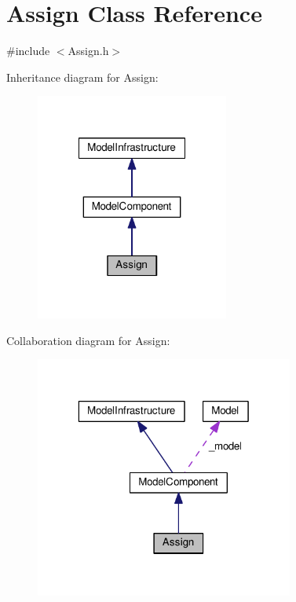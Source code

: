 \hypertarget{class_assign}{\section{Assign Class Reference}
\label{class_assign}
}


{\ttfamily \#include $<$Assign.\-h$>$}



Inheritance diagram for Assign\-:\nopagebreak
\begin{figure}[H]
\begin{center}
\leavevmode
\includegraphics[width=180pt]{class_assign__inherit__graph}
\end{center}
\end{figure}


Collaboration diagram for Assign\-:\nopagebreak
\begin{figure}[H]
\begin{center}
\leavevmode
\includegraphics[width=241pt]{class_assign__coll__graph}
\end{center}
\end{figure}
